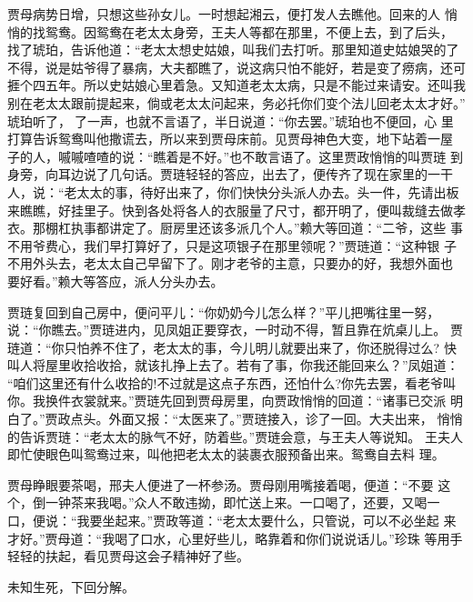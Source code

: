 贾母病势日增，只想这些孙女儿。一时想起湘云，便打发人去瞧他。回来的人
悄悄的找鸳鸯。因鸳鸯在老太太身旁，王夫人等都在那里，不便上去，到了后头，
找了琥珀，告诉他道：“老太太想史姑娘，叫我们去打听。那里知道史姑娘哭的了
不得，说是姑爷得了暴病，大夫都瞧了，说这病只怕不能好，若是变了痨病，还可
捱个四五年。所以史姑娘心里着急。又知道老太太病，只是不能过来请安。还叫我
别在老太太跟前提起来，倘或老太太问起来，务必托你们变个法儿回老太太才好。”
琥珀听了，了一声，也就不言语了，半日说道：“你去罢。”琥珀也不便回，心
里打算告诉鸳鸯叫他撒谎去，所以来到贾母床前。见贾母神色大变，地下站着一屋
子的人，嘁嘁喳喳的说：“瞧着是不好。”也不敢言语了。这里贾政悄悄的叫贾琏
到身旁，向耳边说了几句话。贾琏轻轻的答应，出去了，便传齐了现在家里的一干
人，说：“老太太的事，待好出来了，你们快快分头派人办去。头一件，先请出板
来瞧瞧，好挂里子。快到各处将各人的衣服量了尺寸，都开明了，便叫裁缝去做孝
衣。那棚杠执事都讲定了。厨房里还该多派几个人。”赖大等回道：“二爷，这些
事不用爷费心，我们早打算好了，只是这项银子在那里领呢？”贾琏道：“这种银
子不用外头去，老太太自己早留下了。刚才老爷的主意，只要办的好，我想外面也
要好看。”赖大等答应，派人分头办去。

贾琏复回到自己房中，便问平儿：“你奶奶今儿怎么样？”平儿把嘴往里一努，
说：“你瞧去。”贾琏进内，见凤姐正要穿衣，一时动不得，暂且靠在炕桌儿上。
贾琏道：“你只怕养不住了，老太太的事，今儿明儿就要出来了，你还脱得过么?
快叫人将屋里收拾收拾，就该扎挣上去了。若有了事，你我还能回来么？”凤姐道：
“咱们这里还有什么收拾的!不过就是这点子东西，还怕什么?你先去罢，看老爷叫
你。我换件衣裳就来。”贾琏先回到贾母房里，向贾政悄悄的回道：“诸事已交派
明白了。”贾政点头。外面又报：“太医来了。”贾琏接入，诊了一回。大夫出来，
悄悄的告诉贾琏：“老太太的脉气不好，防着些。”贾琏会意，与王夫人等说知。
王夫人即忙使眼色叫鸳鸯过来，叫他把老太太的装裹衣服预备出来。鸳鸯自去料
理。

贾母睁眼要茶喝，邢夫人便进了一杯参汤。贾母刚用嘴接着喝，便道：“不要
这个，倒一钟茶来我喝。”众人不敢违拗，即忙送上来。一口喝了，还要，又喝一
口，便说：“我要坐起来。”贾政等道：“老太太要什么，只管说，可以不必坐起
来才好。”贾母道：“我喝了口水，心里好些儿，略靠着和你们说说话儿。”珍珠
等用手轻轻的扶起，看见贾母这会子精神好了些。

未知生死，下回分解。